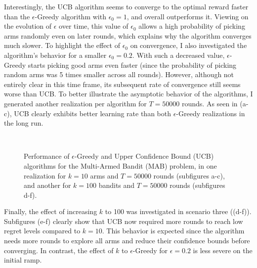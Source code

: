 Interestingly, the UCB algorithm seems to converge to the optimal reward faster than the $\epsilon$-Greedy algorithm with $\epsilon_0=1$, and overall outperforms it. Viewing on the evolution of $\epsilon$ over time, this value of $\epsilon_0$ allows a high probability of picking arms randomly even on later rounds, which explains why the algorithm converges much slower. To highlight the effect of $\epsilon_0$ on convergence, I also investigated the algorithm's behavior for a smaller $\epsilon_0=0.2$. With such a decreased value,  $\epsilon$-Greedy starts picking good arms even faster (since the probability of picking random arms was 5 times smaller across all rounds). However, although not entirely clear in this time frame, its subsequent rate of convergence still seems worse than UCB. To better illustrate the asymptotic behavior of the algorithms, I generated another realization per algorithm for $T=50000$ rounds. As seen in (a-c), UCB clearly exhibits better learning rate than both $\epsilon$-Greedy realizations in the long run.

\begin{figure}[htpb]
\renewcommand*\thesubfigure{\alph{subfigure}}
\centering
	\\
\caption{Performance of $\epsilon$-Greedy and Upper Confidence Bound (UCB) algorithms for the Multi-Armed Bandit (MAB) problem, in one realization for $k=10$ arms and $T=50000$ rounds (subfigures a-c), and another for $k=100$ bandits and $T=50000$ rounds (subfigures d-f).}
\label{fig:2}
\end{figure}

Finally, the effect of increasing $k$ to 100 was investigated in scenario three ((d-f)). Subfigures (e-f) clearly show that UCB now required more rounds to reach low regret levels compared to $k=10$. This behavior is expected since the algorithm needs more rounds to explore all arms and reduce their confidence bounds before converging. In contrast, the effect of $k$ to $\epsilon$-Greedy for $\epsilon=0.2$ is less severe on the initial ramp.

